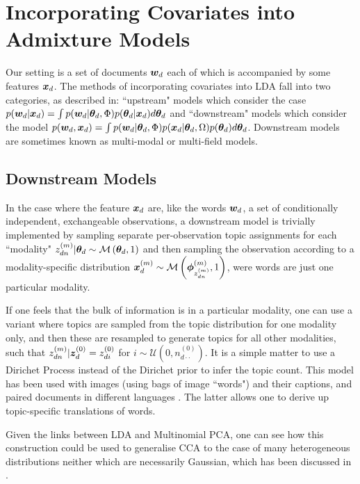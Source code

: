 \section{Incorporating Covariates into Admixture Models}
Our setting is a set of documents $\bm w_d$ each of which is accompanied by some features $\bm x_d$. The methods of incorporating covariates into LDA fall into two categories, as described in\cite{Mimno2008}: ``upstream" models which consider the case $p({ \bm w_d } | { \bm x_d }) = \int p({ \bm w_d }|{ \bm \theta_d }, \Phi)p({ \bm \theta_d }|{ \bm x_d }) d{ \bm \theta_d }$ 
and ``downstream" models which consider the model $p({ \bm w_d }, { \bm x_d }) = \int p({ \bm w_d }|{ \bm \theta_d }, \Phi)p({ \bm x_d }|{ \bm \theta_d }, \Omega)p({ \bm \theta_d })d{ \bm \theta_d }$. Downstream models are sometimes known as multi-modal\cite{Virtanen2012a} or multi-field\cite{Salomatin2009} models.

\subsection{Downstream Models}
In the case where the feature ${ \bm x_d }$ are, like the words ${ \bm w_d }$, a set of conditionally independent, exchangeable observations, a downstream model is trivially implemented\cite{Erosheva2004}\cite{Blei2003} by sampling separate per-observation topic assignments for each ``modality" $z_{dn}^{(m)}|{ \bm \theta_d } \sim \mathcal{M} \left( {{ \bm \theta_d }},{1} \right)$ and then sampling the observation according to a modality-specific distribution $\bm x_d^{(m)} \sim \mathcal{M} \left( {\bm \phi^{(m)}_{z^{(m)}_{dn}}},{1} \right)$, were words are just one particular modality.

If one feels that the bulk of information is in a particular modality, one can use a variant\cite{Blei2003} where topics are sampled from the topic distribution for one modality only, and then these are resampled to generate topics for all other modalities, such that $z_{dn}^{(m)}|\bm z_d^{(0)} = z_{di}^{(0)}$ for $i \sim \mathcal{U}(0, n_{d\cdot\cdot}^{(0)})$. It is a simple matter to use a Dirichet Process instead of the Dirichet prior to infer the topic count\cite{Yakhnenko2009}. This model has been used with images (using bags of image ``words") and their captions\cite{Blei2003}, and paired documents in different languages \cite{Zhao2001}. The latter allows one to derive up topic-specific translations of words.

Given the links between LDA and Multinomial PCA\cite{Buntine2002}, one can see how this construction could be used to generalise CCA to the case of many heterogeneous distributions neither which are necessarily Gaussian, which has been discussed in \cite{Virtanen2012a}. 

